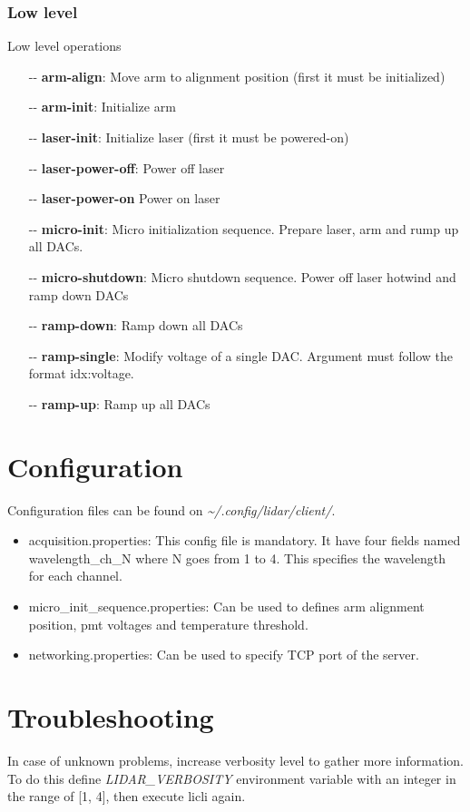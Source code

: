 \documentclass[letterpaper, 10 pt]{article}
\begin{document}
\subsubsection{Low level}
Low level operations
\begin{itemize}
	\item[-{}-] \textbf{arm-align}: Move arm to alignment position (first it must be initialized)
	\item[-{}-] \textbf{arm-init}: Initialize arm
	\item[-{}-] \textbf{laser-init}: Initialize laser (first it must be powered-on)
	\item[-{}-] \textbf{laser-power-off}: Power off laser
	\item[-{}-] \textbf{laser-power-on} Power on laser
	\item[-{}-] \textbf{micro-init}: Micro initialization sequence. Prepare laser, arm and rump up all DACs.
	\item[-{}-] \textbf{micro-shutdown}: Micro shutdown sequence. Power off laser hotwind and ramp down DACs
	\item[-{}-] \textbf{ramp-down}: Ramp down all DACs
	\item[-{}-] \textbf{ramp-single}: Modify voltage of a single DAC. Argument must follow the format idx:voltage.
	\item[-{}-] \textbf{ramp-up}: Ramp up all DACs
\end{itemize}

\section{Configuration} \label{cfg}
Configuration files can be found on \textit{\~{}/.config/lidar/client/}. 
\begin{itemize}
	\item acquisition.properties: This config file is mandatory. It have four fields named wavelength\_ch\_N where N goes from 1 to 4. This specifies the wavelength for each channel. 
	\item micro\_init\_sequence.properties: Can be used to defines arm alignment position, pmt voltages and temperature threshold.
	\item networking.properties: Can be used to specify TCP port of the server.
\end{itemize} 

\section{Troubleshooting}
In case of unknown problems, increase verbosity level to gather more information. To do this define \emph{LIDAR\_VERBOSITY} environment variable with an integer in the range of [1, 4], then execute licli again.
\end{document}
